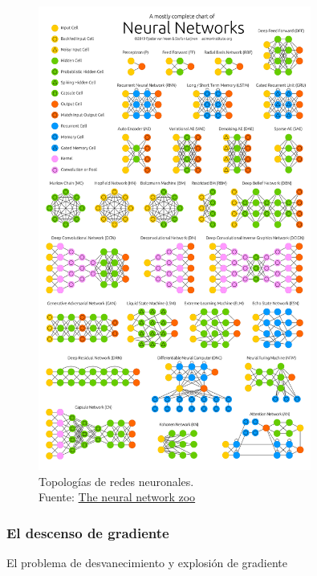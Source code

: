 \begin{figure}[H]
  \centering
  \includegraphics[width=0.8\textwidth]{figures/NeuralNetworkZo19High.png}
  \caption{Topologías de redes neuronales.\\Fuente: \href{https://www.asimovinstitute.org/neural-network-zoo/}{The neural network zoo}}
  \label{fig:NeuralNetworkZo19High}
\end{figure}


\subsubsection{El descenso de gradiente \label{gradient-descent}}
El problema de desvanecimiento y explosión de gradiente



